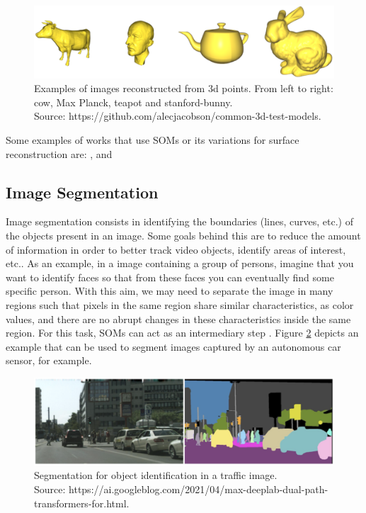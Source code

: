 \begin{figure}[!h]
\centering
\includegraphics[scale=0.35]{figs/reconstruction.eps}
\caption{Examples of images reconstructed from 3d points. From left to right: cow, Max Planck, teapot and stanford-bunny. \\Source: https://github.com/alecjacobson/common-3d-test-models.}
\label{fig:reconstruction}
\end{figure}

Some examples of works that use SOMs or its variations for surface reconstruction are: \cite{Yu99surfacereconstruction}, \cite{1380023} and \cite{4371248}

\subsection{Image Segmentation}

Image segmentation consists in identifying the boundaries (lines, curves, etc.) of the objects present in an image. Some goals behind this are to reduce the amount of information in order to better track video objects, identify areas of interest, etc.. As an example, in a image containing a group of persons, imagine that you want to identify faces so that from these faces you can eventually find some specific person. With this aim, we may need to separate the image in many regions such that pixels in the same region share similar characteristics, as color values, and there are no abrupt changes in these characteristics inside the same region. For this task, SOMs can act as an intermediary step \cite{somImSeg1}\cite{somImSeg2}\cite{somImSeg3}\cite{somImSeg4}. Figure \ref{fig:imgSeg} depicts an example that can be used to segment images captured by an autonomous car sensor, for example. 


\begin{figure}[!h]
\centering
\includegraphics[scale=0.55]{figs/imageSeg.eps}
\caption{Segmentation for object identification in a traffic image.\\ Source: https://ai.googleblog.com/2021/04/max-deeplab-dual-path-transformers-for.html. }
\label{fig:imgSeg}
\end{figure}


